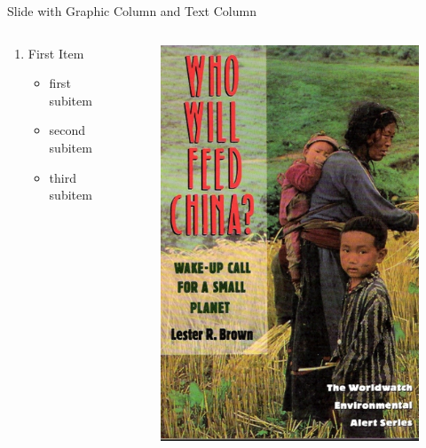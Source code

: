 \documentclass[newPxFont]{beamer}
\begin{document}
\begin{frame}[c]{Slide with Graphic Column and Text Column}
	\begin{columns}
		\begin{column}{.68\linewidth}
			\begin{enumerate}   
				\item{First Item}
				\begin{itemize}  
					\item{first subitem}
					\item{second subitem}
					\item{third subitem}
				\end{itemize}  
			\end{enumerate}
		\end{column}
		\begin{column}{.3\linewidth}
			\begin{figure}
				\centering
				\includegraphics[width=0.9\linewidth]{Brown.png}
			\end{figure}
		\end{column}
	\end{columns}
\end{frame}
\end{document}
